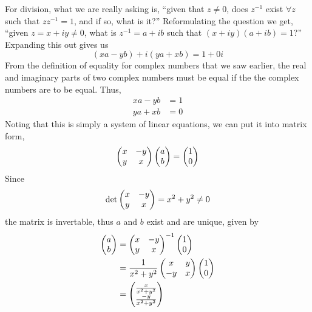 \documentclass[a4paper]{article}
\numberwithin{equation}{subsection}
\theoremstyle{definition}
\theoremstyle{remark}
\newcommand{\inv}[1]{
	{#1}^{-1}
}
\begin{document}
For division, what we are really asking is, 
``given that $z \neq 0$, does $\inv{z}$ exist $\forall z$ such that $z \inv{z} = 1$, and if so, what is it?'' 
Reformulating the question we get,
``given $z = x + iy \neq 0$, what is $\inv{z} = a + ib$ such that $(x+iy)(a+ib) = 1$?''
Expanding this out gives us
\[
(xa - yb) + i(ya + xb) = 1 + 0i
\]
From the definition of equality for complex numbers that we saw earlier,
the real and imaginary parts of two complex numbers must be equal if the the complex numbers are to be equal. Thus,
\begin{align*}
xa - yb &= 1 \\
ya + xb &= 0
\end{align*}
Noting that this is simply a system of linear equations, we can put it into matrix form,
\[
\pmqty{x & -y \\ y & x} \pmqty{a \\ b} = \pmqty{1 \\ 0}
\]
Since 
\[
\det \pmqty{x & -y \\ y & x}  = x^2 + y^2 \neq 0
\]
the matrix is invertable, thus $a$ and $b$ exist and are unique, given by
\begin{align*}
\pmqty{a \\ b} &= \inv{\pmqty{x & -y \\ y & x}} \pmqty{1 \\ 0} \\
&= \frac{1}{x^2 + y^2} \pmqty{x & y \\ -y & x } \pmqty{1 \\ 0} \\
&= \pmqty{\frac{x}{x^2+y^2} \\ \frac{-y}{x^2+y^2}} \\
\end{align*}
\end{document}
